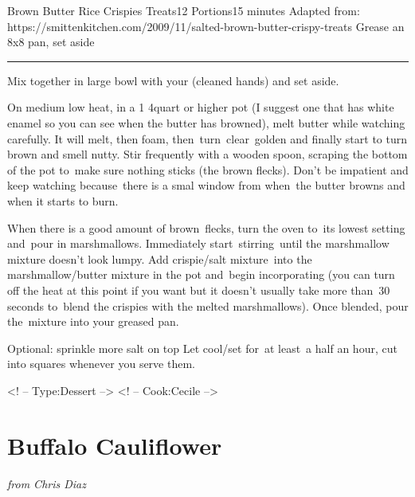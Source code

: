 \documentclass[openany]{book}
\begin{document}
\begin{recipe}[BrownButterRiceCrispieTreats]{Brown Butter Rice Crispies Treats}{12 Portions}{15 minutes}
\freeform Adapted from: https://smittenkitchen.com/2009/11/salted-brown-butter-crispy-treats
\freeform Grease an 8x8 pan, set aside
\freeform\rule{\textwidth}{0.05pt}

Mix together in large bowl with your (cleaned hands) and set aside.

On medium low heat, in a 1 4quart or higher pot (I suggest one that has white enamel so you can see when the butter has browned), melt butter while watching carefully. It will melt, then foam, then turn clear golden and finally start to turn brown and smell nutty. Stir frequently with a wooden spoon, scraping the bottom of the pot to make sure nothing sticks (the brown flecks). Don't be impatient and keep watching because there is a smal window from when the butter browns and when it starts to burn. 

When there is a good amount of brown flecks, turn the oven to its lowest setting and pour in marshmallows. Immediately start stirring until the marshmallow mixture doesn't look lumpy.
Add crispie/salt mixture into the marshmallow/butter mixture in the pot and begin incorporating (you can turn off the heat at this point if you want but it doesn't usually take more than 30 seconds to blend the crispies with the melted marshmallows).
Once blended, pour the mixture into your greased pan.

\freeform Optional: sprinkle more salt on top
\freeform Let cool/set for at least a half an hour, cut into squares whenever you serve them.

\end{recipe}

\textless{}! -- Type:Dessert --\textgreater{} \textless{}! --
Cook:Cecile --\textgreater{}

\chapter{Buffalo Cauliflower}\label{buffalo-cauliflower}

\emph{from Chris Diaz}
\end{document}
